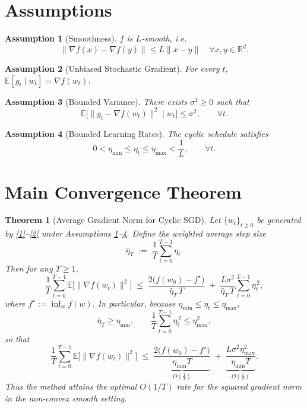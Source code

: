 \documentclass{article}
\newtheorem{theorem}{Theorem}
\newtheorem{assumption}{Assumption}
\newcommand{\E}{\mathbb{E}}
\begin{document}
\newpage
\section*{Assumptions}
\begin{assumption}[Smoothness]\label{as:smooth}
$f$ is $L$‑smooth, i.e.
\[
\|\nabla f(x)-\nabla f(y)\|\le L\|x-y\|\quad\forall x,y\in\mathbb{R}^d .
\]
\end{assumption}
\begin{assumption}[Unbiased Stochastic Gradient]\label{as:unbiased}
For every $t$, $\E[g_t\mid w_t]=\nabla f(w_t)$.
\end{assumption}
\begin{assumption}[Bounded Variance]\label{as:variance}
There exists $\sigma^2\ge0$ such that
\[
\E\big[\|g_t-\nabla f(w_t)\|^2\mid w_t\big]\le\sigma^2,\qquad\forall t .
\]
\end{assumption}
\begin{assumption}[Bounded Learning Rates]\label{as:lr}
The cyclic schedule satisfies
\[
0<\eta_{\min}\le \eta_t\le\eta_{\max}<\frac{1}{L},\qquad\forall t .
\]
\end{assumption}

\section*{Main Convergence Theorem}
\begin{theorem}[Average Gradient Norm for Cyclic SGD]\label{thm:main}
Let $\{w_t\}_{t\ge0}$ be generated by \eqref{1}–\eqref{2} under Assumptions
\ref{as:smooth}–\ref{as:lr}.  Define the weighted average step size
\[
\bar\eta_T \;:=\; \frac{1}{T}\sum_{t=0}^{T-1}\eta_t .
\]
Then for any $T\ge 1$,
\[
\frac{1}{T}\sum_{t=0}^{T-1}\E\big[\|\nabla f(w_t)\|^2\big]
\;\le\;
\frac{2\big(f(w_0)-f^\star\big)}{\bar\eta_T\,T}
\;+\;
\frac{L\sigma^2}{\bar\eta_T\,T}\sum_{t=0}^{T-1}\eta_t^{\,2},
\tag{3}
\]
where $f^\star:=\inf_{w}f(w)$.  In particular, because
$\eta_{\min}\le\eta_t\le\eta_{\max}$,
\[
\bar\eta_T\ge\eta_{\min},\qquad 
\frac{1}{T}\sum_{t=0}^{T-1}\eta_t^{\,2}\le\eta_{\max}^{2},
\]
so that
\[
\frac{1}{T}\sum_{t=0}^{T-1}\E\big[\|\nabla f(w_t)\|^2\big]
\;\le\;
\underbrace{\frac{2\big(f(w_0)-f^\star\big)}{\eta_{\min}T}}_{\displaystyle O\!\left(\frac1T\right)}
\;+\;
\underbrace{\frac{L\sigma^2\eta_{\max}^{2}}{\eta_{\min}T}}_{\displaystyle O\!\left(\frac1T\right)} .
\tag{4}
\]
Thus the method attains the optimal $O(1/T)$ rate for the squared gradient norm in the
non‑convex smooth setting.
\end{theorem}
\end{document}
